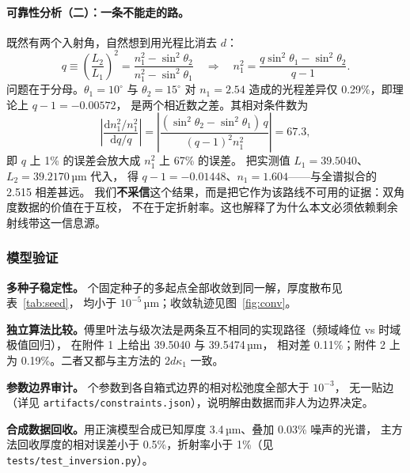 \documentclass[12pt]{article}
\begin{document}
\paragraph{可靠性分析（二）：一条不能走的路。}
既然有两个入射角，自然想到用光程比消去 $d$：
\begin{equation}
  q\equiv\left(\frac{L_2}{L_1}\right)^{2}
   =\frac{n_1^2-\sin^2\theta_2}{n_1^2-\sin^2\theta_1}
  \quad\Longrightarrow\quad
  n_1^{2}=\frac{q\sin^2\theta_1-\sin^2\theta_2}{q-1} .
  \label{eq:twoangle}
\end{equation}
问题在于分母。$\theta_1=10^\circ$ 与 $\theta_2=15^\circ$ 对 $n_1=2.54$ 造成的光程差异仅
0.29\%，即理论上 $q-1=-0.00572$，
是两个相近数之差。其相对条件数为
\begin{equation}
  \left|\frac{\mathrm{d}n_1^2/n_1^2}{\mathrm{d}q/q}\right|
  =\left|\frac{(\sin^2\theta_2-\sin^2\theta_1)\,q}{(q-1)^2 n_1^2}\right|
  =67.3 ,
\end{equation}
即 $q$ 上 1\% 的误差会放大成 $n_1^2$ 上 67\% 的误差。
把实测值 $L_1=39.5040$、$L_2=39.2170$\,µm 代入，
得 $q-1=-0.01448$、$n_1=1.604$——与全谱拟合的 2.515 相差甚远。
我们\textbf{不采信}这个结果，而是把它作为该路线不可用的证据：双角度数据的价值在于互校，
不在于定折射率。这也解释了为什么本文必须依赖剩余射线带这一信息源。

\subsubsection{模型验证}

\textbf{多种子稳定性。} 个固定种子的多起点全部收敛到同一解，厚度散布见表~\ref{tab:seed}，
均小于 $10^{-5}$\,µm；收敛轨迹见图~\ref{fig:conv}。

\textbf{独立算法比较。}\;傅里叶法与级次法是两条互不相同的实现路径（频域峰位 vs 时域极值回归），
在附件 1 上给出 39.5040 与 39.5474\,µm，
相对差 0.11\%；附件 2 上为
0.19\%。二者又都与主方法的 $2d\kappa_1$ 一致。

\textbf{参数边界审计。} 个参数到各自箱式边界的相对松弛度全部大于 $10^{-3}$，
无一贴边（详见 \texttt{artifacts/constraints.json}），说明解由数据而非人为边界决定。

\textbf{合成数据回收。}\;用正演模型合成已知厚度 3.4\,µm、叠加 0.03\% 噪声的光谱，
主方法回收厚度的相对误差小于 0.5\%，折射率小于 1\%（见 \texttt{tests/test\_inversion.py}）。
\end{document}
